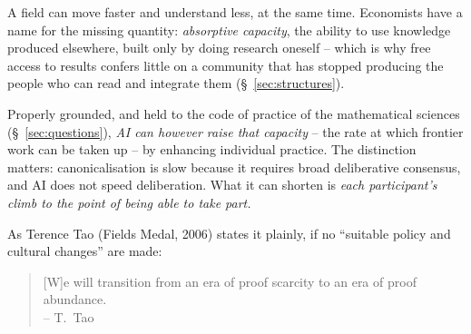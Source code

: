 \documentclass[11pt, a4paper,twosided]{amsart}
\begin{document}
\begin{figure}[h]
\begin{minipage}[t]{0.63\linewidth}
\end{minipage}
\end{figure}

A field can move faster and understand less, at the same time. Economists have a name for the missing quantity: \emph{absorptive capacity}, the ability to use knowledge produced elsewhere, built only by doing research oneself \cite{cohen1990} -- which is why free access to results confers little on a community that has stopped producing the people who can read and integrate them (\S~\ref{sec:structures}). 

Properly grounded, and held to the code of practice of the mathematical sciences (\S~\ref{sec:questions}), \emph{AI can however raise that capacity} -- the rate at which frontier work can be taken up -- by enhancing individual practice. The distinction matters: canonicalisation is slow because it requires broad deliberative consensus, and AI does not speed deliberation. What it can shorten is \emph{each participant's climb to the point of being able to take part.}

As Terence Tao (Fields Medal, 2006) states it plainly, if no ``suitable policy and cultural changes'' are made:

\begin{quotation}
[W]e will transition from an era of proof scarcity to an era of proof abundance.\\[0.2em]
\upshape\footnotesize\hfill -- T.~Tao \cite[slide 44]{icm2026}
\end{quotation}
\end{document}
